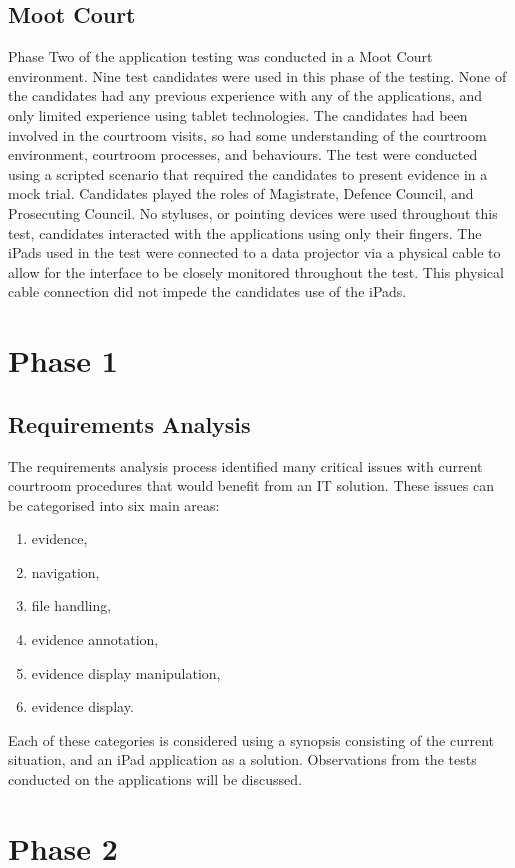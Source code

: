 \subsection{Moot Court}
Phase Two of the application testing was conducted in a Moot Court environment. Nine test candidates were used in this phase of the testing. None of the candidates had any previous experience with any of the applications, and only limited experience using tablet technologies. The candidates had been involved in the courtroom visits, so had some understanding of the courtroom environment, courtroom processes, and behaviours. The test were conducted using a scripted scenario that required the candidates to present evidence in a mock trial. Candidates played the roles of Magistrate, Defence Council, and Prosecuting Council. No styluses, or pointing devices were used throughout this test, candidates interacted with the applications using only their fingers. The iPads used in the test were connected to a data projector via a physical cable to allow for the interface to be closely monitored throughout the test. This physical cable connection did not impede the candidates use of the iPads.

\section{Phase 1}
\subsection{Requirements Analysis}
The requirements analysis process identified many critical issues with current courtroom procedures that would benefit from an IT solution. These issues can be categorised into six main areas:
 
\begin{enumerate}
\item evidence, 
\item navigation,
\item file handling,
\item evidence annotation,
\item evidence display manipulation,
\item evidence display.
\end{enumerate}
Each of these categories is considered using a synopsis consisting of the current situation, and an iPad application as a solution. Observations from the tests conducted on the applications will be discussed.
 
\section{Phase 2} 
